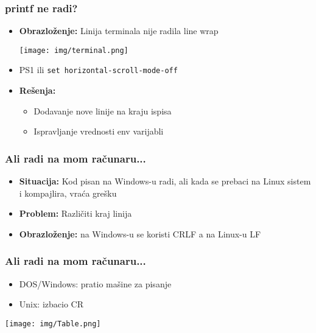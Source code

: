 \documentclass{beamer}
\begin{document}
\begin{frame}
\frametitle{printf ne radi?}
\begin{itemize}
    \item \textbf{Obrazloženje:} Linija terminala nije radila line wrap \newline
    \begin{center}
        \texttt{[image: img/terminal.png]}
    \end{center}
    \item PS1 ili \lstinline|set horizontal-scroll-mode-off| \newline
    \item \textbf{Rešenja: }
    \begin{itemize}
        \item Dodavanje nove linije na kraju ispisa \newline
        \item Ispravljanje vrednosti env varijabli \newline
    \end{itemize}  
    
\end{itemize}
\end{frame}


\begin{frame}
\frametitle{Ali radi na mom računaru...}
\begin{itemize}
    \item \textbf{Situacija:} Kod pisan na Windows-u radi, ali kada se prebaci na Linux sistem i kompajlira, vraća grešku \newline
    \item \textbf{Problem:} Različiti kraj linija \newline
    \item \textbf{Obrazloženje:} na Windows-u se koristi CRLF a na Linux-u LF
\end{itemize}
\end{frame}

\begin{frame}
    \frametitle{Ali radi na mom računaru...}
    \begin{itemize}
        \item DOS/Windows: pratio mašine za pisanje \newline
        \item Unix: izbacio CR        \newline
    \end{itemize}
    \begin{center}
        \texttt{[image: img/Table.png]}
    \end{center}
    \end{frame}
\end{document}
